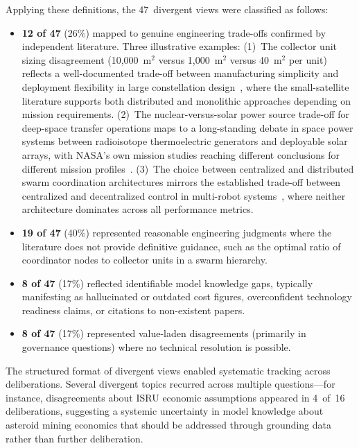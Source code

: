 \documentclass[11pt,a4paper]{article}
\begin{document}
Applying these definitions, the 47~divergent views were classified as follows:

\begin{itemize}[nosep]
    \item \textbf{12 of 47} (26\%) mapped to genuine engineering trade-offs confirmed by independent literature. Three illustrative examples: (1)~The collector unit sizing disagreement (10{,}000~m$^2$ versus 1{,}000~m$^2$ versus 40~m$^2$ per unit) reflects a well-documented trade-off between manufacturing simplicity and deployment flexibility in large constellation design~\cite{barnhart2009smallsat}, where the small-satellite literature supports both distributed and monolithic approaches depending on mission requirements. (2)~The nuclear-versus-solar power source trade-off for deep-space transfer operations maps to a long-standing debate in space power systems between radioisotope thermoelectric generators and deployable solar arrays, with NASA's own mission studies reaching different conclusions for different mission profiles~\cite{nasa2020se}. (3)~The choice between centralized and distributed swarm coordination architectures mirrors the established trade-off between centralized and decentralized control in multi-robot systems~\cite{brambilla2013swarm}, where neither architecture dominates across all performance metrics.
    \item \textbf{19 of 47} (40\%) represented reasonable engineering judgments where the literature does not provide definitive guidance, such as the optimal ratio of coordinator nodes to collector units in a swarm hierarchy.
    \item \textbf{8 of 47} (17\%) reflected identifiable model knowledge gaps, typically manifesting as hallucinated or outdated cost figures, overconfident technology readiness claims, or citations to non-existent papers.
    \item \textbf{8 of 47} (17\%) represented value-laden disagreements (primarily in governance questions) where no technical resolution is possible.
\end{itemize}

The structured format of divergent views enabled systematic tracking across deliberations. Several divergent topics recurred across multiple questions---for instance, disagreements about ISRU economic assumptions appeared in 4~of~16 deliberations, suggesting a systemic uncertainty in model knowledge about asteroid mining economics that should be addressed through grounding data rather than further deliberation.
\end{document}
